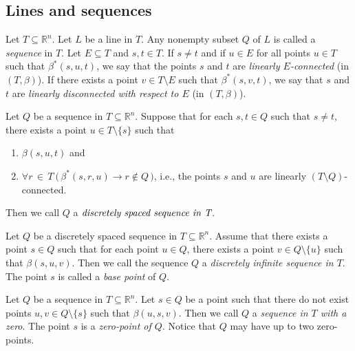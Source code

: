 \documentclass{LMCS}
\theoremstyle{plain}
\newcommand{\rsq}{\mathbb{R}^n}
\begin{document}
\subsection{Lines and sequences}
%
%
Let $T\subseteq \rsq$. Let $L$ be a line in $T$.
%
Any nonempty subset $Q$ of $L$ is called a
%
\emph{sequence} in $T$.
%
Let $E\subseteq T$ and $s,t\in T$. If $s\not=t$ and if $u\in E$ for all points $u\in T$ such that $\beta^*(s,u,t)$, we say that the 
%
points $s$ and $t$ are \emph{linearly $E$-connected} (in $(T,\beta)$). 
%
If there exists a point $v\in T\setminus E$ such that $\beta^*(s,v,t)$,
%
we say that $s$ and $t$ are \emph{linearly disconnected with respect to $E$} (in $(T,\beta)$).
%
%
\begin{defi}\label{discretelyspaceddfn}
%
Let $Q$ be a sequence in $T\subseteq \rsq$. Suppose that for each $s,t\in Q$ such that $s\not=t$, there exists a point $u\in T\setminus\{s\}$ such that 
%
%
%
\begin{enumerate}
%
\item
$\beta(s,u,t)$ and
%
\item
$\forall r\, \in\, T\ \bigl(\, \beta^*(s,r,u)\rightarrow r\not\in Q\, \bigr)$, i.e., the points $s$ and $u$ are linearly $(T\setminus Q)$-connected.
%
\end{enumerate}
%
%
%      
Then we call $Q$ a $\emph{discretely spaced sequence in T}$.
%
\end{defi}
%
%

%
\begin{defi}\label{discretelyinfinitedfn}
%
%
Let $Q$ be a discretely spaced sequence in $T\subseteq \rsq$. Assume that there exists a point $s\in Q$ such that for each point $u\in Q$, there exists a point
%
 $v\in Q\setminus\{u\}$ such that $\beta(s,u,v)$.
%
%
Then we call the sequence $Q$ a \emph{discretely infinite sequence in $T$}. The point $s$ is
%
called a \emph{base point} of $Q$. 
%
\end{defi}
%



%
\begin{defi}\label{sequencewithzero}
%
Let $Q$ be a sequence in $T\subseteq \rsq$. Let $s\in Q$ be a
%
point such that there do not exist
%
points $u,v\in Q\setminus\{s\}$ such that $\beta(u,s,v)$.
%
Then we call $Q$ a \emph{sequence in $T$ with a zero}.
%
The point $s$ is a \emph{zero-point of $Q$}.
%
Notice that $Q$ may have up to two
%
zero-points.
%
\end{defi}
%
\end{document}
